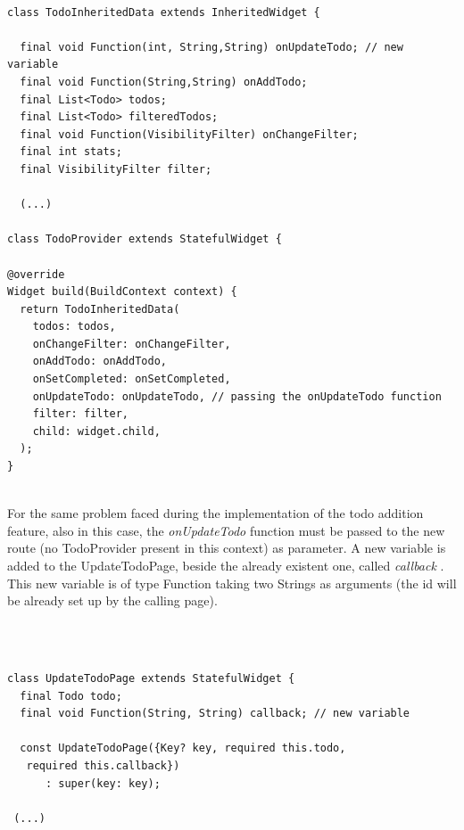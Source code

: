 \begin{code}

\mbox{}

\label{code:2.38}
\begin{verbatim}

class TodoInheritedData extends InheritedWidget {
  
  final void Function(int, String,String) onUpdateTodo; // new variable
  final void Function(String,String) onAddTodo; 
  final List<Todo> todos;
  final List<Todo> filteredTodos;
  final void Function(VisibilityFilter) onChangeFilter;
  final int stats;
  final VisibilityFilter filter;

  (...)

class TodoProvider extends StatefulWidget {

@override
Widget build(BuildContext context) {
  return TodoInheritedData(
    todos: todos,
    onChangeFilter: onChangeFilter,
    onAddTodo: onAddTodo,
    onSetCompleted: onSetCompleted,
    onUpdateTodo: onUpdateTodo, // passing the onUpdateTodo function
    filter: filter,
    child: widget.child,
  );
}
\end{verbatim}
\end{code}
\mbox{}\\
For the same problem faced during the implementation of the todo addition feature, also in this case, the \textit{onUpdateTodo } function must be passed to the new route (no TodoProvider present in this context) as parameter. A new variable is added to the UpdateTodoPage, beside the already existent one, called \textit{callback }. This new variable is of type Function taking two Strings as arguments (the id will be already set up by the calling page).
\begin{code}
\mbox{}\\
\mbox{}
\label{code:2.39}
\begin{verbatim}

class UpdateTodoPage extends StatefulWidget {
  final Todo todo;
  final void Function(String, String) callback; // new variable

  const UpdateTodoPage({Key? key, required this.todo,
   required this.callback})
      : super(key: key);
 
 (...)
 
 \end{verbatim}
 \end{code}
